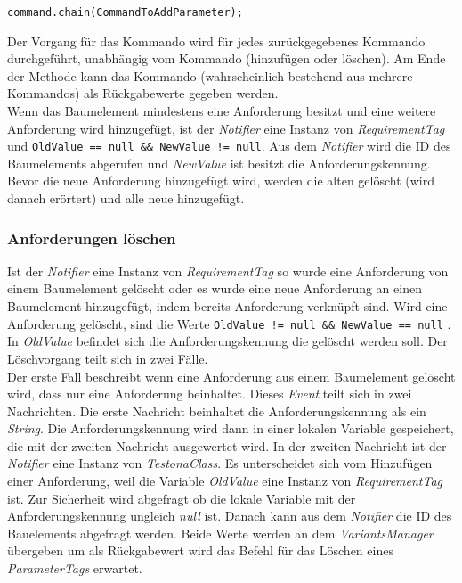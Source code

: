 \begin{lstlisting}
command.chain(CommandToAddParameter);
\end{lstlisting}

Der Vorgang für das Kommando wird für jedes zurückgegebenes Kommando durchgeführt, unabhängig vom Kommando (hinzufügen oder löschen). Am Ende der Methode kann das Kommando (wahrscheinlich bestehend aus mehrere Kommandos) als Rückgabewerte gegeben werden.\\


Wenn das Baumelement mindestens eine Anforderung besitzt und eine weitere Anforderung wird hinzugefügt, ist der \textit{Notifier} eine Instanz von \textit{RequirementTag} und \texttt{OldValue == null \&\& NewValue != null}. Aus dem \textit{Notifier} wird die ID des Baumelements abgerufen und \textit{NewValue} ist besitzt die Anforderungskennung. Bevor die neue Anforderung hinzugefügt wird, werden die alten gelöscht (wird danach erörtert) und alle neue hinzugefügt.\\


\subsubsection{Anforderungen löschen}
Ist der \textit{Notifier} eine Instanz von \textit{RequirementTag} so wurde eine Anforderung von einem Baumelement gelöscht oder es wurde eine neue Anforderung an einen Baumelement hinzugefügt, indem bereits Anforderung verknüpft sind. Wird eine Anforderung gelöscht, sind die Werte \texttt{OldValue != null \&\& NewValue == null} . In \textit{OldValue} befindet sich die Anforderungskennung die gelöscht werden soll. Der Löschvorgang teilt sich in zwei Fälle.\\


Der erste Fall beschreibt wenn eine Anforderung aus einem Baumelement gelöscht wird, dass nur eine Anforderung beinhaltet. Dieses \textit{Event} teilt sich in zwei Nachrichten. Die erste Nachricht beinhaltet die Anforderungskennung als ein \textit{String}. Die Anforderungskennung wird dann in einer lokalen Variable gespeichert, die mit der zweiten Nachricht ausgewertet wird. In der zweiten Nachricht ist der \textit{Notifier} eine Instanz von \textit{TestonaClass}. Es unterscheidet sich vom Hinzufügen einer Anforderung, weil die Variable \textit{OldValue} eine Instanz von \textit{RequirementTag} ist. Zur Sicherheit wird abgefragt ob die lokale Variable mit der Anforderungskennung ungleich \textit{null} ist. Danach kann aus dem \textit{Notifier} die ID des Bauelements abgefragt werden. Beide Werte werden an dem \textit{VariantsManager} übergeben um als Rückgabewert wird das Befehl für das Löschen eines \textit{ParameterTags}  erwartet.\\


